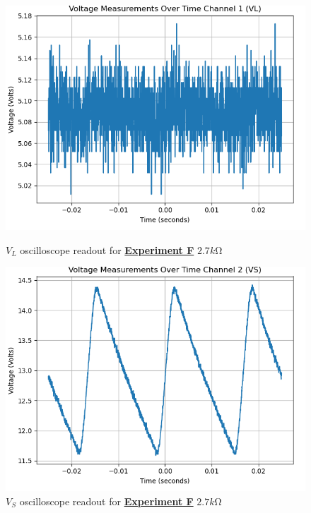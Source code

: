 \documentclass[
	letterpaper
	12pt
]{template}
\newcommand{\bref}[2]{\textbf{\hyperref[#1]{#2}}}
\begin{document}
\begin{figure}[H]\label{data::F6}
	\centering
	\begin{minipage}[c]{0.45\textwidth}
		\centering
		\includegraphics[width=\textwidth]{figures/F/6--ch1.png}
	    \caption{$V_L$ oscilloscope readout for \bref{exp::F}{Experiment F} $2.7\unit{k\ohm}$ }
	\end{minipage}
	\hfill
	\begin{minipage}[c]{0.45\textwidth}
		\centering
		\includegraphics[width=\textwidth]{figures/F/6--ch2.png}
	    \caption{$V_S$ oscilloscope readout for \bref{exp::F}{Experiment F} $2.7\unit{k\ohm}$ }
	\end{minipage}
\end{figure}
\end{document}
